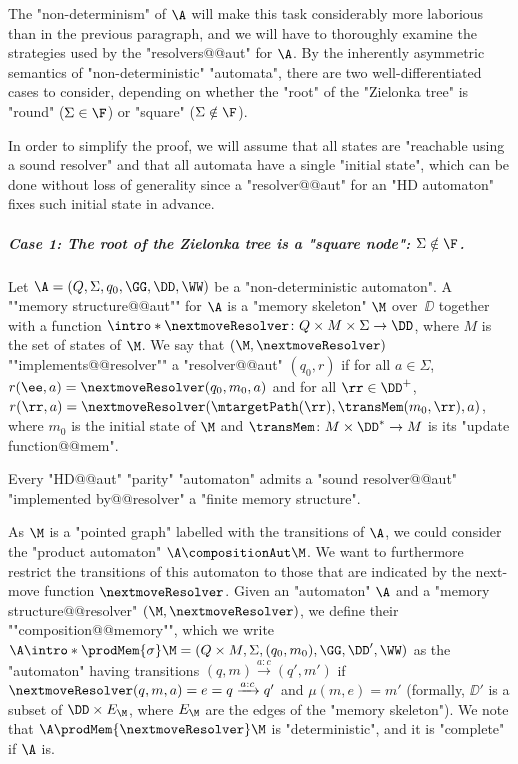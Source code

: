 \documentclass[10pt,a4paper]{amsart}
\renewcommand{\ss}{\sigma}
\renewcommand{\SS}{\Sigma}
\newcommand{\re}[1]{\xrightarrow{#1}}
\begin{document}
The "non-determinism" of $\A$ will make this task considerably more laborious than in the previous paragraph, and we will have to thoroughly examine the strategies used by the "resolvers@@aut" for $\A$.
By the inherently asymmetric semantics of "non-deterministic" "automata", there are two well-differentiated cases to consider, depending on whether the "root" of the "Zielonka tree" is "round" ($\SS\in \F$) or "square" ($\SS\notin \F$).


In order to simplify the proof, we will assume that all states are "reachable using a sound resolver" and that all automata have a single "initial state", which can be done without loss of generality since a "resolver@@aut" for an "HD automaton" fixes such initial state in advance.

\subparagraph*{Case 1: The root of the Zielonka tree is a "square node": $\SS\notin \F$.}

\AP Let $\A = (Q,\Sigma, q_0, \GG, \DD, \WW)$ be a "non-deterministic automaton". A ""memory structure@@aut"" for $\A$ is a "memory skeleton" $\M$ over~$\DD$ together with a function $\intro*\nextmoveResolver\colon Q\times M \times \SS \to \DD$, where $M$ is the set of states of $\M$.
\AP We say that $(\M, \nextmoveResolver)$ ""implements@@resolver"" a "resolver@@aut" $(q_0,r)$ if  for all $a\in \SS$, $r(\ee,a) = \nextmoveResolver(q_0,m_0,a)$ and for all $\rr\in \DD^+$, $r(\rr,a) = \nextmoveResolver(\mtargetPath(\rr), \transMem(m_0, \rr), a)$, where $m_0$ is the initial state of $\M$ and $\transMem\colon M\times \DD^*\to M$ is its "update function@@mem".


\begin{lemma}\label{lemma-ZT:finite-memory-resolvers}
	Every "HD@@aut" "parity" "automaton" admits a "sound resolver@@aut" "implemented by@@resolver" a "finite memory structure".
\end{lemma}

As $\M$ is a "pointed graph" labelled with the transitions of $\A$, we could consider the "product automaton" $\A\compositionAut \M$. We want to furthermore restrict the transitions of this automaton to those that are indicated by the next-move function $\nextmoveResolver$.
\AP Given an "automaton" $\A$ and a "memory structure@@resolver" $(\M, \nextmoveResolver)$, we define their ""composition@@memory"", which we write $\A \intro*\prodMem{\ss} \M = (Q\times M, \SS, (q_0,m_0), \GG, \DD', \WW)$ as the "automaton" having transitions $(q,m) \re{a:c} (q',m')$ if $\nextmoveResolver(q,m,a) = e = q\re{a:c} q'$ and $\mu(m,e) = m'$ (formally, $\DD'$ is a subset of $\DD\times E_\M$, where $E_\M$ are the edges of the "memory skeleton"). We note that $\A \prodMem{\nextmoveResolver} \M$ is "deterministic", and it is "complete" if $\A$ is.
\end{document}

